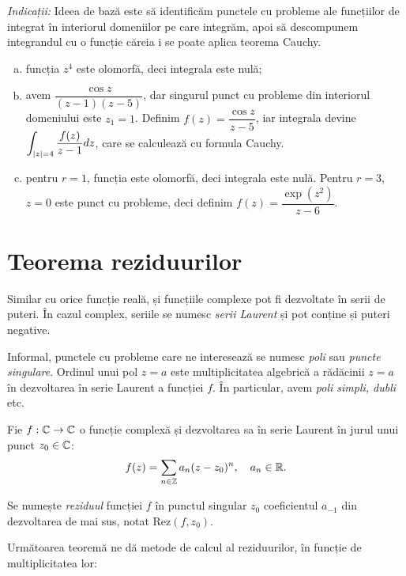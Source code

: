\emph{Indicații:} Ideea de bază este să identificăm punctele cu probleme ale
funcțiilor de integrat în interiorul domeniilor pe care integrăm, apoi să descompunem
integrandul cu o funcție căreia i se poate aplica teorema Cauchy.
\begin{enumerate}[(a)]
\item funcția $ z^4 $ este olomorfă, deci integrala este nulă;
\item avem $ \dfrac{\cos z}{(z - 1)(z - 5)} $, dar singurul punct cu probleme din interiorul
  domeniului este $ z_1 = 1 $. Definim $ f(z) = \dfrac{\cos z}{z - 5} $, iar integrala
  devine $ \displaystyle\int_{|z| = 4} \dfrac{f(z)}{z - 1} dz $, care se calculează cu formula Cauchy.
\item pentru $ r = 1 $, funcția este olomorfă, deci integrala este nulă. Pentru $ r = 3 $,
  $ z = 0 $ este punct cu probleme, deci definim $ f(z) = \dfrac{\exp(z^2)}{z - 6} $.
\end{enumerate}


\section{Teorema reziduurilor}

Similar cu orice funcție reală, și funcțiile complexe pot fi dezvoltate în serii
de puteri. În cazul complex, seriile se numesc \emph{serii Laurent} și pot conține
și puteri negative.

Informal, punctele cu probleme care ne interesează se numesc \emph{poli}
sau \emph{puncte singulare}. Ordinul unui pol $ z = a $ este multiplicitatea algebrică
a rădăcinii $ z = a $ în dezvoltarea în serie Laurent a funcției $ f $. În particular,
avem \emph{poli simpli, dubli} etc.

\begin{definition}\label{def:rez}
  Fie $ f : \mathbb{C} \to \mathbb{C} $ o funcție complexă și dezvoltarea sa în serie Laurent
  în jurul unui punct $ z_0 \in \mathbb{C} $:
  \[
    f(z) = \sum_{n \in \mathbb{Z}} a_n (z - z_0)^n, \quad a_n \in \mathbb{R}.
  \]

  Se numește \emph{reziduul} funcției $ f $ în punctul singular $ z_0 $ coeficientul
  $ a_{-1} $ din dezvoltarea de mai sus, notat $ \mathrm{Rez}(f, z_0) $.
\end{definition}

Următoarea teoremă ne dă metode de calcul al reziduurilor, în funcție de multiplicitatea
lor:

